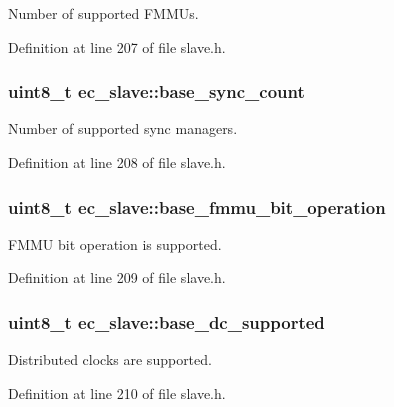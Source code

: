 Number of supported F\-M\-M\-Us. 



Definition at line 207 of file slave.\-h.

\subsubsection[{base\-\_\-sync\-\_\-count}]{\setlength{\rightskip}{0pt plus 5cm}uint8\-\_\-t ec\-\_\-slave\-::base\-\_\-sync\-\_\-count}\label{structec__slave_aa4d67d55717398c4f25d379ede390d5d}


Number of supported sync managers. 



Definition at line 208 of file slave.\-h.

\subsubsection[{base\-\_\-fmmu\-\_\-bit\-\_\-operation}]{\setlength{\rightskip}{0pt plus 5cm}uint8\-\_\-t ec\-\_\-slave\-::base\-\_\-fmmu\-\_\-bit\-\_\-operation}\label{structec__slave_a39d39fe2e87602de4629cfbdb0106929}


F\-M\-M\-U bit operation is supported. 



Definition at line 209 of file slave.\-h.

\subsubsection[{base\-\_\-dc\-\_\-supported}]{\setlength{\rightskip}{0pt plus 5cm}uint8\-\_\-t ec\-\_\-slave\-::base\-\_\-dc\-\_\-supported}\label{structec__slave_a2b02f5e40a79f9b6213dde898a10b873}


Distributed clocks are supported. 



Definition at line 210 of file slave.\-h.

